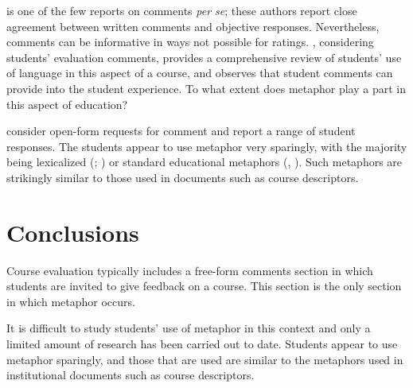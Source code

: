  is one of the few reports on comments \emph{per
  se}; these authors report close agreement between written comments
and objective responses.  Nevertheless, comments can be informative in
ways not possible for ratings.  , considering
students' evaluation comments, provides a comprehensive review of
students' use of language in this aspect of a course, and observes
that student comments can provide  into the
student experience.  To what extent does metaphor play a part in this
aspect of education?

 consider open-form requests for comment and report
a range of student responses.  The students appear to use metaphor
very sparingly, with the majority being lexicalized (; ) or standard educational
metaphors (, ).  Such metaphors are strikingly similar to those used in
documents such as course descriptors.

\section{Conclusions}

Course evaluation typically includes a free-form comments section in
which students are invited to give feedback on a course.  This section
is the only section in which metaphor occurs.

It is difficult to study students' use of metaphor in this context and
only a limited amount of research has been carried out to date.
Students appear to use metaphor sparingly, and those that are used are
similar to the metaphors used in institutional documents such as
course descriptors.
